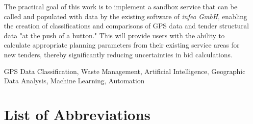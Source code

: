 \documentclass[a4paper,12pt,twoside]{scrreprt}
\begin{document}
The practical goal of this work is to implement a sandbox service that can be
called and populated with data by the existing software of \textit{infeo GmbH},
enabling the
creation of classifications and comparisons of GPS data and tender structural
data "at the push of a button." This will provide users with the ability to
calculate appropriate planning parameters from their existing service areas for
new tenders, thereby significantly reducing uncertainties in bid calculations.
\vspace{0.5cm}

\noindent
GPS Data Classification, Waste Management, Artificial Intelligence, Geographic
Data Analysis, Machine Learning, Automation



\cleardoublepage   %
\tableofcontents

\clearpage
{}
{}
\listoffigures

\clearpage
{}
{}
\listoftables

\clearpage
{}
{}
\chapter*{List of Abbreviations} %
\begin{acronym}[GPS]
\end{acronym}
\end{document}
